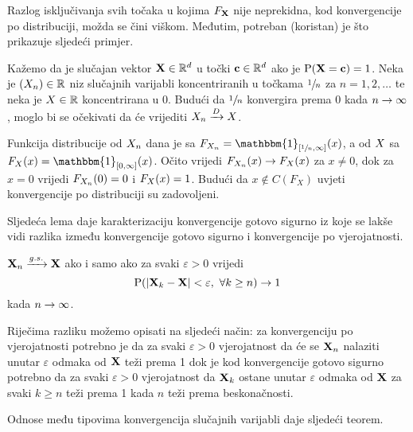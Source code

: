 Razlog isključivanja svih točaka u kojima $F_{\tsvek{X}}$ nije neprekidna, kod
konvergencije po distribuciji, možda se čini viškom. Međutim,
potreban (koristan) je što prikazuje sljedeći primjer.

\begin{primjer_}
	Kažemo da je slučajan vektor $\tsvek{X} \in \mathbb{R}^d$
	u točki $\tv{c} \in \mathbb{R}^d$ ako je $\vP( \tsvek{X} = \tv{c} )=1$.
	Neka je $(\tsvar{X}_n) \in \mathbb{R}$  niz slučajnih varijabli
	koncentriranih u točkama $\sfrac{1}{n}$ za $n=1,2,\ldots$
	te neka je $\tsvar{X} \in \mathbb{R}$ koncentrirana u 0. Budući da
	$\sfrac{1}{n}$ konvergira prema 0 kada $n \rightarrow \infty$, moglo bi se
	očekivati da će vrijediti $\konvpd{\tsvar{X}_n}{\tsvar{X}}$.

	Funkcija distribucije od $\tsvar{X}_n$ dana je sa 
	$F_{\tsvar{X}_n} = \mathbbm{1}_{[\sfrac{1}{n},\infty]}(x)$,
	a od $\tsvar{X}$ sa $F_{\tsvar{X}} (x) = \mathbbm{1}_{[0,\infty]}(x)$.
	Očito vrijedi
	$\konv{F_{\tsvar{X}_n}(x)}{F_{\tsvar{X}}(x)}$ za $x \neq 0$, dok za $x=0$ vrijedi
	$F_{\tsvar{X}_n}(0) = 0$ i $F_{\tsvar{X}} (x) = 1$. Budući da $x \notin C(F_X)$
	uvjeti konvergencije po distribuciji su zadovoljeni.
\end{primjer_}

Sljedeća lema daje karakterizaciju konvergencije gotovo sigurno
iz koje se lakše vidi razlika između konvergencije
gotovo sigurno i konvergencije po vjerojatnosti.

\begin{lem}
	$\konvgs{\tsvek{X}_n}{\tsvek{X}}$ ako i samo ako za svaki
	$\varepsilon >0$ vrijedi
	\begin{equation} \label{equ:karakterizacijakonvgs}
		\vP( |\tsvek{X}_k - \tsvek{X}| < \varepsilon,\ \forall k \geq n) \rightarrow 1
	\end{equation}
	kada $n \rightarrow \infty$.
\end{lem}

Riječima razliku možemo opisati na sljedeći način:
za konvergenciju po vjerojatnosti potrebno je da za svaki $\varepsilon >0$
vjerojatnost da će se $\tsvek{X}_n$ nalaziti unutar $\varepsilon$ odmaka od 
$\tsvek{X}$ teži
prema 1 dok je kod konvergencije gotovo sigurno potrebno da za svaki
$\varepsilon >0$ vjerojatnost da $\tsvek{X}_k$ ostane unutar $\varepsilon$ odmaka
od $\tsvek{X}$ za svaki $k \geq n$ teži prema 1 kada $n$ teži prema beskonačnosti.

Odnose među tipovima konvergencija slučajnih varijabli daje sljedeći teorem.

